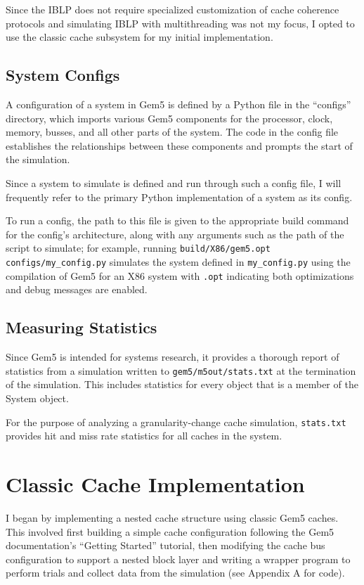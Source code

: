 \documentclass[12pt,twoside]{reedthesis}
\begin{document}
	Since the IBLP does not require specialized customization of cache coherence protocols and simulating IBLP with multithreading was not my focus, I opted to use the classic cache subsystem for my initial implementation.

	\subsection*{System Configs}

	A configuration of a system in Gem5 is defined by a Python file in the ``configs'' directory, which imports various Gem5 components for the processor, clock, memory, busses, and all other parts of the system. The code in the config file establishes the relationships between these components and prompts the start of the simulation.

	Since a system to simulate is defined and run through such a config file, I will frequently refer to the primary Python implementation of a system as its config.

	To run a config, the path to this file is given to the appropriate build command for the config's architecture, along with any arguments such as the path of the script to simulate; for example, running \verb`build/X86/gem5.opt configs/my_config.py` simulates the system defined in \verb`my_config.py` using the compilation of Gem5 for an X86 system with \verb`.opt` indicating both optimizations and debug messages are enabled.

	\subsection*{Measuring Statistics}

	Since Gem5 is intended for systems research, it provides a thorough report of statistics from a simulation written to \verb`gem5/m5out/stats.txt` at the termination of the simulation. This includes statistics for every object that is a member of the System object.

	For the purpose of analyzing a granularity-change cache simulation, \verb`stats.txt` provides hit and miss rate statistics for all caches in the system.

\section{Classic Cache Implementation}

	I began by implementing a nested cache structure using classic Gem5 caches. This involved first building a simple cache configuration following the Gem5 documentation's ``Getting Started'' tutorial, then modifying the cache bus configuration to support a nested block layer and writing a wrapper program to perform trials and collect data from the simulation (see Appendix A for code).
\end{document}
